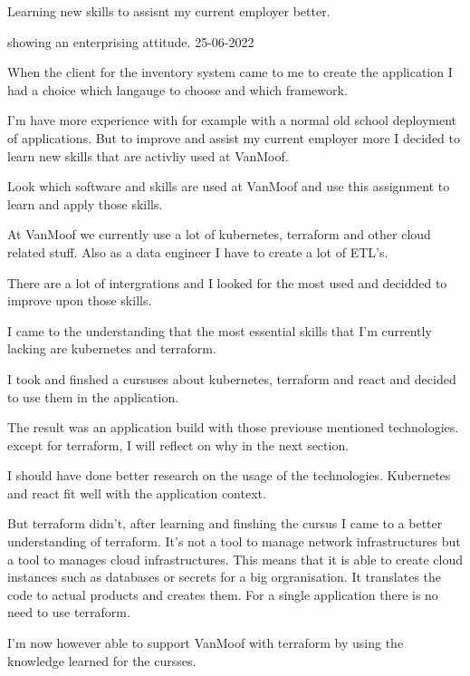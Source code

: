 {%
	\bewijs
	{%
		Learning new skills to assisnt my current employer better.
	}
	{%
		\starr
		{%
			showing an enterprising attitude.%
		}
		{%
			25-06-2022
		}
		{%

			When the client for the inventory system came to me to create the application I had a choice which langauge to choose and which framework.

			I'm have more experience with for example with a normal old school deployment of applications.
			But to improve and assist my current employer more I decided to learn new skills that are activliy used at VanMoof.
		}
		{%
			Look which software and skills are used at VanMoof and use this assignment to learn and apply those skills.
		}
		{%
			At VanMoof we currently use a lot of kubernetes, terraform and other cloud related stuff.
			Also as a data engineer I have to create a lot of ETL's.

			There are a lot of intergrations and I looked for the most used and decidded to improve upon those skills.
		}
		{%
			I came to the understanding that the most essential skills that I'm currently lacking are kubernetes and terraform.

			I took and finshed a cursuses about kubernetes, terraform and react and decided to use them in the application.

			The result was an application build with those previouse mentioned technologies.
			except for terraform, I will reflect on why in the next section.
		}
		{%
			I should have done better research on the usage of the technologies.
			Kubernetes and react fit well with the application context.

			But terraform didn't, after learning and finshing the cursus I came to a better understanding of terraform.
			It's not a tool to manage network infrastructures but a tool to manages cloud infrastructures.
			This means that it is able to create cloud instances such as databases or secrets for a big orgranisation.
			It translates the code to actual products and creates them.
			For a single application there is no need to use terraform.

			I'm now however able to support VanMoof with terraform by using the knowledge learned for the cursses.
		}

}}
